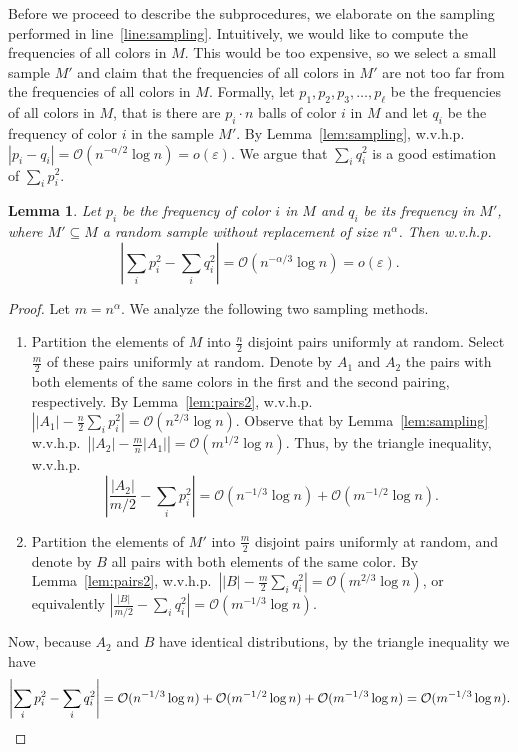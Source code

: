 \documentclass{article}[11pt,a4paper]
\newtheorem{lemma}[definition]{Lemma}
\newcommand{\bigo}{\mathcal{O}}
\begin{document}
Before we proceed to describe the subprocedures, we elaborate on the sampling performed
in line~\ref{line:sampling}. Intuitively, we would like to compute the frequencies of all colors
in $M$. This would be too expensive, so we select a small sample $M'$ and claim that the
frequencies of all colors in $M'$ are not too far from the frequencies of all colors in $M$.
Formally, let $p_1, p_2, p_3, \ldots, p_\ell$ be the frequencies of all colors in $M$, that is
there are $p_i \cdot n$ balls of color $i$ in $M$ and let $q_i$ be the
frequency of color $i$ in the sample $M'$. By Lemma~\ref{lem:sampling}, w.v.h.p.\ 
$|p_i - q_i| = \bigo(n^{-\alpha/2} \log n)=o(\varepsilon)$. We argue that $\sum_i q_i^2$
is a good estimation of $\sum_i p_i^2$.


\begin{lemma}
\label{lem:sum_of_squares}
Let $p_i$ be the frequency of color $i$ in $M$ and $q_i$ be its frequency in $M'$, where
$M'\subseteq M$ a random sample without replacement of size $n^\alpha$. Then w.v.h.p.
\[\left|\sum_i p_i^2 - \sum_i q_i^2\right| = \bigo(n^{-\alpha/3} \log n) = o(\varepsilon) .\]
\end{lemma}

\begin{proof}
Let $m  = n^{\alpha}$. We analyze the following two sampling methods. 

\begin{enumerate}
\item Partition the elements of $M$ into $\frac{n}{2}$ disjoint pairs uniformly at random.
Select $\frac{m}{2}$ of these pairs uniformly at random. Denote by $A_1$ and $A_2$
the pairs with both elements of the same colors in the first and the second pairing, respectively.
By Lemma~\ref{lem:pairs2}, w.v.h.p.\ $\left||A_1| - \frac{n}{2} \sum_i p_i^2\right| = \bigo(n^{2/3} \log n)$.
Observe that by Lemma~\ref{lem:sampling} w.v.h.p.\ $\left| |A_2| - \frac{m}{n} |A_1| \right| = \bigo(m^{1/2} \log n)$. Thus, by the triangle inequality, w.v.h.p.
\[ \left| \frac{|A_2|}{m/2} - \sum_i p_i^2\right| = \bigo(n^{-1/3} \log n) + \bigo(m^{-1/2} \log n).\]

\item Partition the elements of $M'$ into $\frac{m}{2}$ disjoint pairs uniformly at random, and denote
by $B$ all pairs with both elements of the same color. By Lemma~\ref{lem:pairs2}, w.v.h.p.\ 
$\left| |B| - \frac{m}{2} \sum_i q_i^2 \right| = \bigo(m^{2/3} \log n)$, or equivalently
$\left|\frac{|B|}{m/2} - \sum_i q_i^2 \right| = \bigo(m^{-1/3} \log n)$.
\end{enumerate}

Now, because $A_2$ and $B$ have identical distributions, by the triangle inequality we have
\[
\left|\sum_i p_i^2 - \sum_i q_i^2\right| = \bigo(n^{-1/3} \log n) + \bigo(m^{-1/2} \log n) + \bigo(m^{-1/3} \log n) = \bigo(m^{-1/3} \log n). \qedhere
\]
\end{proof}
\end{document}
